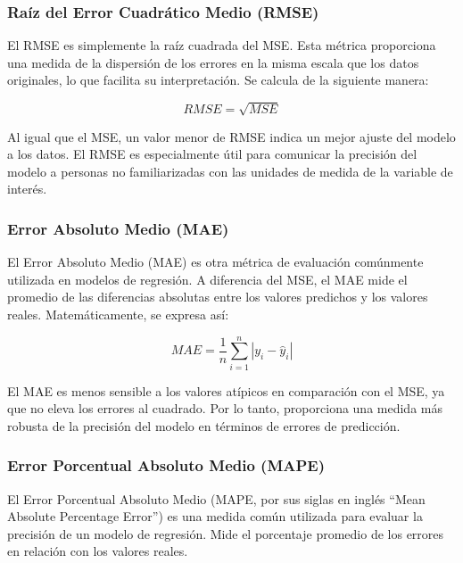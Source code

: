 \documentclass[
  11pt,
  bookmarksnumbered]{article}
\begin{document}
\hypertarget{rauxedz-del-error-cuadruxe1tico-medio-rmse}{%
\subsubsection{Raíz del Error Cuadrático Medio (RMSE)}\label{rauxedz-del-error-cuadruxe1tico-medio-rmse}}

El RMSE es simplemente la raíz cuadrada del MSE.
Esta métrica proporciona una medida de la dispersión de los errores en la misma escala que los datos originales, lo que facilita su interpretación.
Se calcula de la siguiente manera:

\[RMSE = \sqrt{MSE}\]

Al igual que el MSE, un valor menor de RMSE indica un mejor ajuste del modelo a los datos.
El RMSE es especialmente útil para comunicar la precisión del modelo a personas no familiarizadas con las unidades de medida de la variable de interés.

\hypertarget{error-absoluto-medio-mae}{%
\subsubsection{Error Absoluto Medio (MAE)}\label{error-absoluto-medio-mae}}

El Error Absoluto Medio (MAE) es otra métrica de evaluación comúnmente utilizada en modelos de regresión.
A diferencia del MSE, el MAE mide el promedio de las diferencias absolutas entre los valores predichos y los valores reales.
Matemáticamente, se expresa así:

\[MAE = \frac{1}{n} \sum_{i=1}^{n} |y_i - \hat{y}_i|\]

El MAE es menos sensible a los valores atípicos en comparación con el MSE, ya que no eleva los errores al cuadrado.
Por lo tanto, proporciona una medida más robusta de la precisión del modelo en términos de errores de predicción.

\hypertarget{error-porcentual-absoluto-medio-mape}{%
\subsubsection{Error Porcentual Absoluto Medio (MAPE)}\label{error-porcentual-absoluto-medio-mape}}

El Error Porcentual Absoluto Medio (MAPE, por sus siglas en inglés ``Mean Absolute Percentage Error'') es una medida común utilizada para evaluar la precisión de un modelo de regresión.
Mide el porcentaje promedio de los errores en relación con los valores reales.
\end{document}
